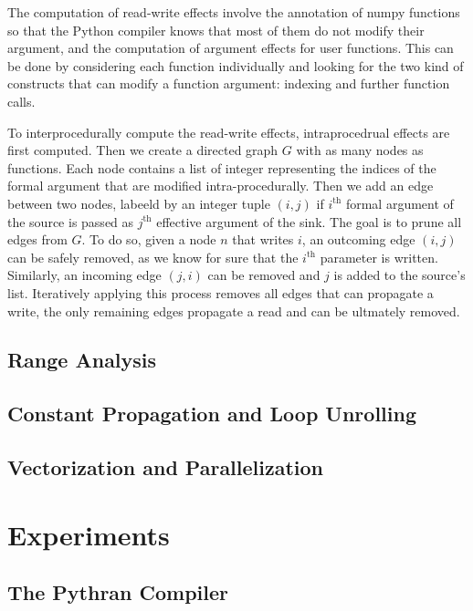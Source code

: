 \documentclass[10pt, preprint]{sigplanconf}
\begin{document}
The computation of read-write effects involve the annotation of numpy functions
so that the Python compiler knows that most of them do not modify their
argument, and the computation of argument effects for user functions. This can
be done by considering each function individually and looking for the two kind
of constructs that can modify a function argument: indexing and further
function calls.

To interprocedurally compute the read-write effects, intraprocedrual effects
are first computed. Then we create a directed graph $G$ with as many nodes as
functions. Each node contains a list of integer representing the indices of the
formal argument that are modified intra-procedurally. Then we add an edge
between two nodes, labeeld by an integer tuple $(i, j)$ if $i^\text{th}$ formal
argument of the source is passed as $j^\text{th}$ effective argument of the
sink. The goal is to prune all edges from $G$. To do so, given a node $n$ that
writes $i$, an outcoming edge $(i,j)$ can be safely removed, as we know for
sure that the $i^\text{th}$ parameter is written.  Similarly, an incoming edge
$(j,i)$ can be removed and $j$ is added to the source's list. Iteratively
applying this process removes all edges that can propagate a write, the only
remaining edges propagate a read and can be ultmately removed.


\subsection{Range Analysis}

\subsection{Constant Propagation and Loop Unrolling}

\subsection{Vectorization and Parallelization}

\cite{esterie2012boost, pyhpc2013, wpmvp2014}

\section{Experiments}
\label{sec:xp}

\subsection{The Pythran Compiler}
\cite{pythran2013,isocxx11}
\end{document}
